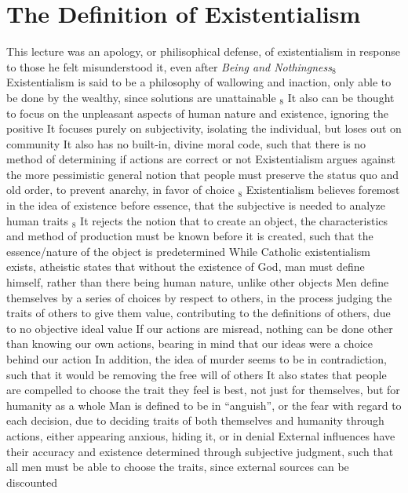 \documentclass[11 pt, twoside]{article}
\newenvironment{outline*}
{
	\begin{outline}[enumerate]
	}
	{\end{outline}
}
\newcommand{\foota}[1]{\hyperlink{#1}{$_#1$}}
\begin{document}
\section{The Definition of Existentialism}
\begin{outline*}
\1 This lecture was an apology, or philisophical defense, of existentialism in response to those he felt misunderstood it, even after \textit{Being and Nothingness}\foota{8}
\1 Existentialism is said to be a philosophy of wallowing and inaction, only able to be done by the wealthy, since solutions are unattainable \foota{8}
\2 It also can be thought to focus on the unpleasant aspects of human nature and existence, ignoring the positive
\2 It focuses purely on subjectivity, isolating the individual, but loses out on community
\2 It also has no built-in, divine moral code, such that there is no method of determining if actions are correct or not
\1 Existentialism argues against the more pessimistic general notion that people must preserve the status quo and old order, to prevent anarchy, in favor of choice \foota{8}
\1 Existentialism believes foremost in the idea of existence before essence, that the subjective is needed to analyze human traits \foota{8}
\2 It rejects the notion that to create an object, the characteristics and method of production must be known before it is created, such that the essence/nature of the object is predetermined
\2 While Catholic existentialism exists, atheistic states that without the existence of God, man must define himself, rather than there being human nature, unlike other objects
\2 Men define themselves by a series of choices by respect to others, in the process judging the traits of others to give them value, contributing to the definitions of others, due to no objective ideal value
\1 If our actions are misread, nothing can be done other than knowing our own actions, bearing in mind that our ideas were a choice behind our action
\2 In addition, the idea of murder seems to be in contradiction, such that it would be removing the free will of others
\2 It also states that people are compelled to choose the trait they feel is best, not just for themselves, but for humanity as a whole
\1 Man is defined to be in ``anguish'', or the fear with regard to each decision, due to deciding traits of both themselves and humanity through actions, either appearing anxious, hiding it, or in denial
\2 External influences have their accuracy and existence determined through subjective judgment, such that all men must be able to choose the traits, since external sources can be discounted

\end{outline*}
\end{document}
